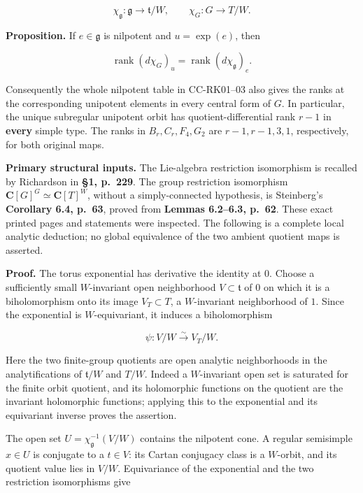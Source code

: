 \documentclass[11pt,a4paper]{article}
\theoremstyle{definition}\newtheorem{definition}[theorem]{Definition}
\theoremstyle{remark}\newtheorem{remark}[theorem]{Remark}
\begin{document}
\[
 \chi_{\mathfrak g}:\mathfrak g\longrightarrow\mathfrak t/W,
 \qquad
 \chi_G:G\longrightarrow T/W.
\]

\textbf{Proposition.} If \(e\in\mathfrak g\) is nilpotent and \(u=\exp(e)\), then

\[
 \operatorname{rank}(d\chi_G)_u
       =\operatorname{rank}(d\chi_{\mathfrak g})_e.
 \tag{CC-RK.4}
\]

Consequently the whole nilpotent table in CC-RK01--03 also gives the ranks at the corresponding unipotent elements in every central form of \(G\). In particular, the unique subregular unipotent orbit has quotient-differential rank \(r-1\) in \textbf{every} simple type. The ranks in \(B_r,C_r,F_4,G_2\) are \(r-1,r-1,3,1\), respectively, for both original maps.

\textbf{Primary structural inputs.} The Lie-algebra restriction isomorphism is recalled by Richardson in \textbf{§1, p.~229}. The group restriction isomorphism
\(\mathbf C[G]^G\simeq\mathbf C[T]^W\), without a simply-connected hypothesis, is Steinberg's \textbf{Corollary 6.4, p.~63}, proved from \textbf{Lemmas 6.2--6.3, p.~62}. These exact printed pages and statements were inspected. The following is a complete local analytic deduction; no global equivalence of the two ambient quotient maps is asserted.

\textbf{Proof.} The torus exponential has derivative the identity at \(0\). Choose a sufficiently small \(W\)-invariant open neighborhood \(V\subset\mathfrak t\) of \(0\) on which it is a biholomorphism onto its image \(V_T\subset T\), a \(W\)-invariant neighborhood of \(1\). Since the exponential is \(W\)-equivariant, it induces a biholomorphism

\[
 \psi:V/W\xrightarrow{\sim}V_T/W.
 \tag{CC-RK.5}
\]

Here the two finite-group quotients are open analytic neighborhoods in the analytifications of \(\mathfrak t/W\) and \(T/W\). Indeed a \(W\)-invariant open set is saturated for the finite orbit quotient, and its holomorphic functions on the quotient are the invariant holomorphic functions; applying this to the exponential and its equivariant inverse proves the assertion.

The open set \(U=\chi_{\mathfrak g}^{-1}(V/W)\) contains the nilpotent cone. A regular semisimple \(x\in U\) is conjugate to a \(t\in V\): its Cartan conjugacy class is a \(W\)-orbit, and its quotient value lies in \(V/W\). Equivariance of the exponential and the two restriction isomorphisms give
\end{document}
